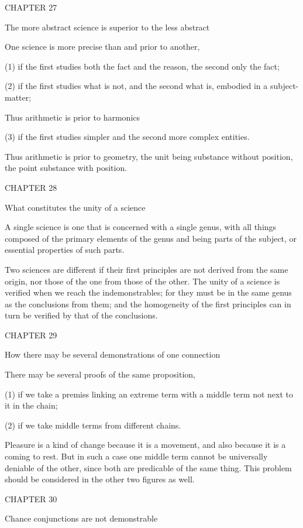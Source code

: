 CHAPTER 27

The more abstract science is superior to the less abstract

One science is more precise than and prior to another,

(1) if the first studies both the fact and the reason,
the second only the fact;

(2) if the first studies what is not,
and the second what is, embodied in a subject-matter;

    Thus arithmetic is prior to harmonics

(3) if the first studies simpler and
the second more complex entities.

    Thus arithmetic is prior to geometry,
    the unit being substance without position,
    the point substance with position.

CHAPTER 28

What constitutes the unity of a science

A single science is one that is concerned with a single genus,
with all things composed of the primary elements of the genus and
being parts of the subject, or essential properties of such parts.

Two sciences are different if their first principles are not derived
from the same origin, nor those of the one from those of the other.
The unity of a science is verified when we reach the indemonstrables;
for they must be in the same genus as the conclusions from them;
and the homogeneity of the first principles can in turn be verified
by that of the conclusions.

CHAPTER 29

How there may be several demonstrations of one connection

There may be several proofs of the same proposition,

(1) if we take a premiss linking an extreme term with a middle term
not next to it in the chain;

(2) if we take middle terms from different chains.

    Pleasure is a kind of change because it is a movement,
    and also because it is a coming to rest.
    But in such a case one middle term cannot be universally deniable
    of the other, since both are predicable of the same thing.
    This problem should be considered in the other two figures as well.

CHAPTER 30

Chance conjunctions are not demonstrable


